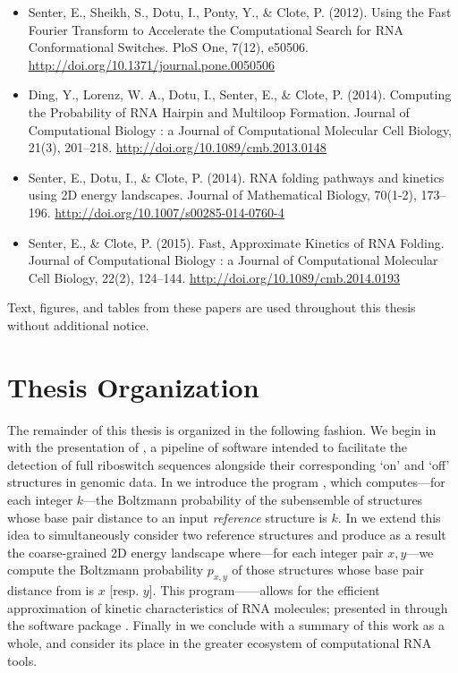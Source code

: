 \begin{itemize}
\item Senter, E., Sheikh, S., Dotu, I., Ponty, Y., \& Clote, P. (2012). Using the Fast Fourier Transform to Accelerate the Computational Search for RNA Conformational Switches. PloS One, 7(12), e50506. \url{http://doi.org/10.1371/journal.pone.0050506}
\item Ding, Y., Lorenz, W. A., Dotu, I., Senter, E., \& Clote, P. (2014). Computing the Probability of RNA Hairpin and Multiloop Formation. Journal of Computational Biology : a Journal of Computational Molecular Cell Biology, 21(3), 201–218. \url{http://doi.org/10.1089/cmb.2013.0148}
\item Senter, E., Dotu, I., \& Clote, P. (2014). RNA folding pathways and kinetics using 2D energy landscapes. Journal of Mathematical Biology, 70(1-2), 173–196. \url{http://doi.org/10.1007/s00285-014-0760-4}
\item Senter, E., \& Clote, P. (2015). Fast, Approximate Kinetics of RNA Folding. Journal of Computational Biology : a Journal of Computational Molecular Cell Biology, 22(2), 124–144. \url{http://doi.org/10.1089/cmb.2014.0193}
\end{itemize}

Text, figures, and tables from these papers are used throughout this thesis without
additional notice.

\section{Thesis Organization}
\label{sec:intro:thesisorg}

The remainder of this thesis is organized in the following fashion. We begin in
 with the presentation of \rfinder, a pipeline of
software intended to facilitate the detection of full riboswitch sequences
alongside their corresponding `on' and `off' structures in genomic data. In
 we introduce the program \fftbor, which computes---for
each integer $k$---the Boltzmann probability \pk of the subensemble of structures
whose base pair distance to an input {\em reference} structure \str is $k$.
In  we extend this idea to simultaneously consider two
reference structures \strST and produce as a result the coarse-grained 2D energy
landscape where---for each integer pair $x,y$---we compute the Boltzmann
probability $p_{x,y}$
of those structures whose base pair distance from  is $x$
[resp. $y$]. This program---\ffttwo---allows for the efficient approximation of
kinetic characteristics of RNA molecules; presented in 
through the software package \hermes. Finally in  we conclude
with a summary of this work as a whole, and consider its place in the greater
ecosystem of computational RNA tools.

